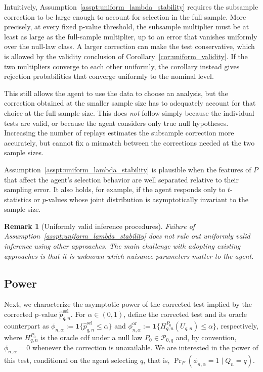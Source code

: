 \documentclass[10pt]{article}
\newtheorem{remark}{Remark}
\begin{document}
Intuitively, Assumption~\ref{asspt:uniform_lambda_stability} requires the subsample correction to be large enough to account for selection in the full sample. More precisely, at every fixed p-value threshold, the subsample multiplier must be at least as large as the full-sample multiplier, up to an error that vanishes uniformly over the null-law class. A larger correction can make the test conservative, which is allowed by the validity conclusion of Corollary~\ref{cor:uniform_validity}. If the two multipliers converge to each other uniformly, the corollary instead gives rejection probabilities that converge uniformly to the nominal level.

This still allows the agent to use the data to choose an analysis, but the correction obtained at the smaller sample size has to adequately account for that choice at the full sample size. This does \emph{not} follow simply because the individual tests are valid, or because the agent considers only true null hypotheses. Increasing the number of replays estimates the subsample correction more accurately, but cannot fix a mismatch between the corrections needed at the two sample sizes.

Assumption~\ref{asspt:uniform_lambda_stability} is plausible when the features of $P$ that affect the agent's selection behavior are well separated relative to their sampling error. It also holds, for example, if the agent responds only to $t$-statistics or $p$-values whose joint distribution is asymptotically invariant to the sample size.

\begin{remark}[Uniformly valid inference procedures]
Failure of Assumption~\ref{asspt:uniform_lambda_stability} does not rule out uniformly valid inference using other approaches. The main challenge with adopting existing approaches \citep[e.g.,][]{andrews2009hybrid,mccloskey2017bonferroni} is that it is unknown which nuisance parameters matter to the agent.
\end{remark}

\subsection{Power}\label{sec:replay_power}

Next, we characterize the asymptotic power of the corrected test implied by the corrected p-value $\widehat p_{q,n}^{\mathrm{sel}}$. For $\alpha\in(0,1)$, define the corrected test and its oracle counterpart as $\phi_{n,\alpha}:=\mathbf 1\{\widehat p_{q,n}^{\mathrm{sel}}\le\alpha\}$ and $\phi^{\mathrm{or}}_{n,\alpha}:=\mathbf 1\{H_{q,n}^{P_0}(U_{q,n})\le\alpha\}$, respectively, where $H_{q,n}^{P_0}$ is the oracle cdf under a null law $P_0\in\mathcal P_{0,q}$ and, by convention, $\phi_{n,\alpha}=0$ whenever the correction is unavailable. We are interested in the power of this test, conditional on the agent selecting $q$, that is, $\Pr_{P}(\phi_{n,\alpha}=1\mid Q_n=q)$.
\end{document}
